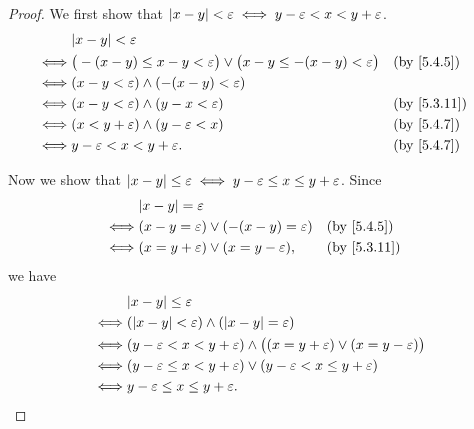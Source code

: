 \begin{proof}
	We first show that \(\left\lvert x - y\right\rvert < \varepsilon \iff y - \varepsilon < x < y + \varepsilon\).
	\begin{align*}
		     & \abs{x - y} < \varepsilon                                                                                     \\
		\iff & \big(-(x - y) \leq x - y < \varepsilon\big) \lor \big(x - y \leq -(x - y) < \varepsilon\big) &  & \by{5.4.5}  \\
		\iff & (x - y < \varepsilon) \land (-(x - y) < \varepsilon)                                                          \\
		\iff & (x - y < \varepsilon) \land (y - x < \varepsilon)                                            &  & \by{5.3.11} \\
		\iff & (x < y + \varepsilon) \land (y - \varepsilon < x)                                            &  & \by{5.4.7}  \\
		\iff & y - \varepsilon < x < y + \varepsilon.                                                       &  & \by{5.4.7}
	\end{align*}

	Now we show that \(\left\lvert x - y\right\rvert \leq \varepsilon \iff y - \varepsilon \leq x \leq y + \varepsilon\).
	Since
	\begin{align*}
		     & \abs{x - y} = \varepsilon                                            \\
		\iff & (x - y = \varepsilon) \lor (-(x - y) = \varepsilon) &  & \by{5.4.5}  \\
		\iff & (x = y + \varepsilon) \lor (x = y - \varepsilon),   &  & \by{5.3.11}
	\end{align*}
	we have
	\begin{align*}
		     & \abs{x - y} \leq \varepsilon                                                                             \\
		\iff & (\abs{x - y} < \varepsilon) \land (\abs{x - y} = \varepsilon)                                            \\
		\iff & (y - \varepsilon < x < y + \varepsilon) \land \big((x = y + \varepsilon) \lor (x = y - \varepsilon)\big) \\
		\iff & (y - \varepsilon \leq x < y + \varepsilon) \lor (y - \varepsilon < x \leq y + \varepsilon)               \\
		\iff & y - \varepsilon \leq x \leq y + \varepsilon.
	\end{align*}
\end{proof}

